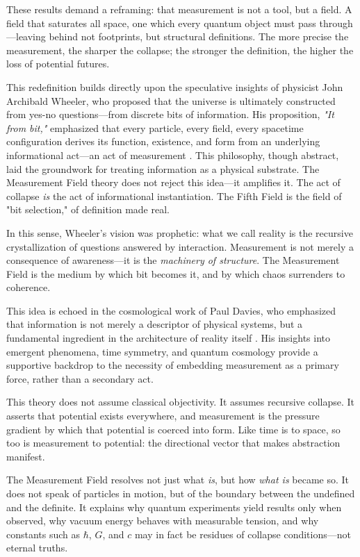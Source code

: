 These results demand a reframing: that measurement is not a tool, but a field. A field that saturates all space, one which every quantum object must pass through—leaving behind not footprints, but structural definitions. The more precise the measurement, the sharper the collapse; the stronger the definition, the higher the loss of potential futures.

This redefinition builds directly upon the speculative insights of physicist John Archibald Wheeler, who proposed that the universe is ultimately constructed from yes-no questions—from discrete bits of information. His proposition, \textit{"It from bit,"} emphasized that every particle, every field, every spacetime configuration derives its function, existence, and form from an underlying informational act—an act of measurement \cite{wheeler1990it}. This philosophy, though abstract, laid the groundwork for treating information as a physical substrate. The Measurement Field theory does not reject this idea—it amplifies it. The act of collapse \textit{is} the act of informational instantiation. The Fifth Field is the field of "bit selection," of definition made real.

In this sense, Wheeler’s vision was prophetic: what we call reality is the recursive crystallization of questions answered by interaction. Measurement is not merely a consequence of awareness—it is the \textit{machinery of structure}. The Measurement Field is the medium by which bit becomes it, and by which chaos surrenders to coherence.

This idea is echoed in the cosmological work of Paul Davies, who emphasized that information is not merely a descriptor of physical systems, but a fundamental ingredient in the architecture of reality itself \cite{davies2004emergent}. His insights into emergent phenomena, time symmetry, and quantum cosmology provide a supportive backdrop to the necessity of embedding measurement as a primary force, rather than a secondary act.

This theory does not assume classical objectivity. It assumes recursive collapse. It asserts that potential exists everywhere, and measurement is the pressure gradient by which that potential is coerced into form. Like time is to space, so too is measurement to potential: the directional vector that makes abstraction manifest.

The Measurement Field resolves not just what \textit{is}, but how \textit{what is} became so. It does not speak of particles in motion, but of the boundary between the undefined and the definite. It explains why quantum experiments yield results only when observed, why vacuum energy behaves with measurable tension, and why constants such as $\hbar$, $G$, and $c$ may in fact be residues of collapse conditions—not eternal truths.

